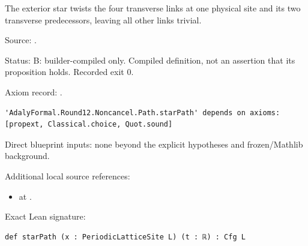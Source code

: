 \begin{definition}[bp-198]
\label{bp-198}
\uses{}
\leanok
The exterior star twists the four transverse links at one physical site and its two transverse predecessors, leaving all other links trivial.

\par Source: \texttt{}.
\par Status: B: builder-compiled only. Compiled definition, not an assertion that its proposition holds. Recorded exit 0.
\par Axiom record: \texttt{}.
\begin{verbatim}
'AdalyFormal.Round12.Noncancel.Path.starPath' depends on axioms: [propext, Classical.choice, Quot.sound]
\end{verbatim}
\par Direct blueprint inputs: none beyond the explicit hypotheses and frozen/Mathlib background.
\par Additional local source references:
\begin{itemize}
\item \texttt{} at \texttt{}.
\end{itemize}
\par Exact Lean signature:
\begin{verbatim}
def starPath (x : PeriodicLatticeSite L) (t : ℝ) : Cfg L
\end{verbatim}
\end{definition}

